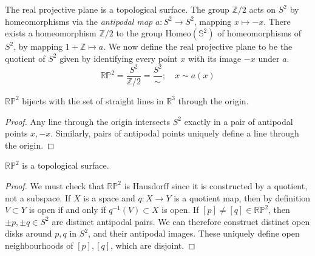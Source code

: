 \begin{example}
	The real projective plane is a topological surface.
	The group \( \mathbb Z / 2 \) acts on \( S^2 \) by homeomorphisms via the \textit{antipodal map} \( a \colon S^2 \to S^2 \), mapping \( x \mapsto -x \).
	There exists a homeomorphism \( \mathbb Z / 2 \) to the group \( \mathrm{Homeo}(\mathbb S^2) \) of homeomorphisms of \( S^2 \), by mapping \( 1 + \mathbb Z \mapsto a \).
	We now define the real projective plane to be the quotient of \( S^2 \) given by identifying every point \( x \) with its image \( -x \) under \( a \).
	\[ \mathbb R \mathbb P^2 = \frac{S^2}{\mathbb Z/2} = \frac{S^2}{\sim};\quad x \sim a(x) \]
	\begin{lemma}
		\( \mathbb R \mathbb P^2 \) bijects with the set of straight lines in \( \mathbb R^3 \) through the origin.
	\end{lemma}
	\begin{proof}
		Any line through the origin intersects \( S^2 \) exactly in a pair of antipodal points \( x, -x \).
		Similarly, pairs of antipodal points uniquely define a line through the origin.
	\end{proof}
	\begin{lemma}
		\( \mathbb R \mathbb P^2 \) is a topological surface.
	\end{lemma}
	\begin{proof}
		We must check that \( \mathbb R \mathbb P^2 \) is Hausdorff since it is constructed by a quotient, not a subspace.
		If \( X \) is a space and \( q \colon X \to Y \) is a quotient map, then by definition \( V \subset Y \) is open if and only if \( q^{-1}(V) \subset X \) is open.
		If \( [p] \neq [q] \in \mathbb R \mathbb P^2 \), then \( \pm p, \pm q \in S^2 \) are distinct antipodal pairs.
		We can therefore construct distinct open disks around \( p, q \) in \( S^2 \), and their antipodal images.
		These uniquely define open neighbourhoods of \( [p], [q] \), which are disjoint.
	\end{proof}
\end{example}
